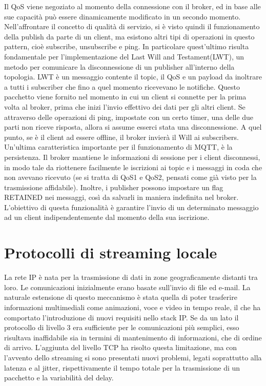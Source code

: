 Il QoS viene negoziato al momento della connessione con il broker, ed in base alle sue capacità può essere dinamicamente modificato in un secondo momento. Nell'affrontare il concetto di qualità di servizio, si è visto quindi il funzionamento della publish da parte di un client, ma esistono altri tipi di operazioni in questo pattern, cioè subscribe, unsubscribe e ping. In particolare quest'ultimo risulta fondamentale per l'implementazione del Last Will and Testament(LWT), un metodo per comunicare la disconnessione di un publisher all'interno della topologia. LWT è un messaggio contente il topic, il QoS e un payload da inoltrare a tutti i subscriber che fino a quel momento ricevevano le notifiche. Questo pacchetto viene fornito nel momento in cui un client si connette per la prima volta al broker, prima che inizi l'invio effettivo dei dati per gli altri client. Se attraverso delle operazioni di ping, impostate con un certo timer, una delle due parti non riceve risposta, allora si assume esserci stata una disconnessione. A quel punto, se è il client ad essere offline, il broker invierà il Will ai subscribers. Un'ultima caratteristica importante per il funzionamento di MQTT, è la persistenza. Il broker mantiene le informazioni di sessione per i client disconnessi, in modo tale da riottenere facilmente le iscrizioni ai topic e i messaggi in coda che non avevano ricevuto (se si tratta di QoS1 e QoS2, pensati come già visto per la trasmissione affidabile). Inoltre, i publisher possono impostare un flag RETAINED nei messaggi, così da salvarli in maniera indefinita nel broker. L'obiettivo di questa funzionalità è garantire l'invio di un determinato messaggio ad un client indipendentemente dal momento della sua iscrizione.  

\section{Protocolli di streaming locale}
La rete IP è nata per la trasmissione di dati in zone geograficamente distanti tra loro. Le comunicazioni inizialmente erano basate sull'invio di file ed e-mail. La naturale estensione di questo meccanismo è stata quella di poter trasferire informazioni multimediali come animazioni, voce e video in tempo reale, il che ha comportato l'introduzione di nuovi requisiti nello stack IP. Se da un lato il protocollo di livello 3 era sufficiente per le comunicazioni più semplici, esso risultava inaffidabile sia in termini di mantenimento di informazioni, che di ordine di arrivo. L'aggiunta del livello TCP ha risolto questa limitazione, ma con l'avvento dello streaming si sono presentati nuovi problemi, legati soprattutto alla latenza e al jitter, rispettivamente il tempo totale per la trasmissione di un pacchetto e la variabilità del delay. 

